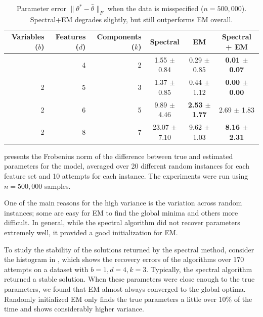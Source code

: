 \begin{table}[tbhp]
\caption{Parameter error $\|\theta^* - \hat \theta\|_F$ when the data is misspecified ($n = 500,000$).
Spectral+EM degrades slightly, but still outperforms EM overall.
}
\label{tbl:parameter-recovery-mis}
\vskip 0.15in
\begin{center}
\begin{small}
\begin{sc}

  \begin{tabular}{ r r r c c c }
\hline
\abovespace\belowspace
Variables ($b$) & Features ($d$) & Components ($k$) & Spectral & EM & Spectral + EM \\
\hline
\abovespace
 1 & 4 & 2 &  1.55 $\pm$ 0.84 & 0.29 $\pm$ 0.85 &  {\bf 0.01 $\pm$ 0.07} \\
 2 & 5 & 3 &  1.37 $\pm$ 0.85 & 0.44 $\pm$ 1.12 &  {\bf 0.00 $\pm$ 0.00} \\
 2 & 6 & 5 &  9.89 $\pm$ 4.46 & {\bf 2.53 $\pm$ 1.77} &  2.69 $\pm$ 1.83 \\
 2 & 8 & 7 & 23.07 $\pm$ 7.10 & 9.62 $\pm$ 1.03 &  {\bf 8.16 $\pm$ 2.31}  \\
\hline

\end{tabular}
\end{sc}
\end{small}
\end{center}
\vskip -0.1in
\end{table}


 presents the Frobenius norm of the
difference between true and estimated parameters for the model, averaged
over 20 different random instances for each feature set and 10 attempts
for each instance. The experiments were run using $n = 500,000$ samples.

One of the main reasons for the high variance is the variation across
random instances; some are easy for EM to find the global minima and
others more difficult. In general, while the spectral algorithm did not
recover parameters extremely well, it provided a good initialization for
EM.

To study the stability of the solutions returned by the spectral method,
consider the histogram in , which shows the recovery
errors of the algorithms over 170 attempts on a dataset with $b = 1, d = 4,
k = 3$. Typically, the spectral algorithm returned a stable solution.
When these parameters were close enough to the true parameters, we found
that EM almost always converged to the global optima. Randomly
initialized EM only finds the true parameters a little over 10\% of the
time and shows considerably higher variance. 

